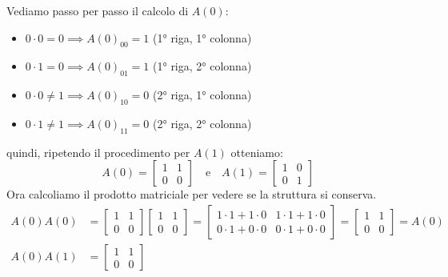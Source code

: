 \documentclass[../main.tex]{subfiles}
\begin{document}
\begin{example}
    Vediamo passo per passo il calcolo di $A(0)$:
    \begin{itemize}
        \item $0 \cdot 0 = 0 \implies A(0)_{00} = 1$ (1° riga, 1° colonna)
        \item $0 \cdot 1 = 0 \implies A(0)_{01} = 1$ (1° riga, 2° colonna)
        \item $0 \cdot 0 \neq 1 \implies A(0)_{10} = 0$ (2° riga, 1° colonna)
        \item $0 \cdot 1 \neq 1 \implies A(0)_{11} = 0$ (2° riga, 2° colonna)
    \end{itemize}
    quindi, ripetendo il procedimento per $A(1)$ otteniamo:
    \[
        A(0) = \begin{bmatrix}
            1 & 1 \\
            0 & 0
        \end{bmatrix}
        \quad \text{e} \quad
        A(1) = \begin{bmatrix}
            1 & 0 \\
            0 & 1
        \end{bmatrix}
    \]
    Ora calcoliamo il prodotto matriciale per vedere se la struttura si conserva.
    \begin{align*}
        A(0)A(0) & = \begin{bmatrix}
                         1 & 1 \\
                         0 & 0
                     \end{bmatrix}
        \begin{bmatrix}
            1 & 1 \\
            0 & 0
        \end{bmatrix}
        = \begin{bmatrix}
              1 \cdot 1 + 1 \cdot 0 & 1 \cdot 1 + 1 \cdot 0 \\
              0 \cdot 1 + 0 \cdot 0 & 0 \cdot 1 + 0 \cdot 0
          \end{bmatrix}
        = \begin{bmatrix}
              1 & 1 \\
              0 & 0
          \end{bmatrix}
        = A(0)                      \\
        A(0)A(1) & = \begin{bmatrix}
                         1 & 1 \\
                         0 & 0
                     \end{bmatrix}

\end{align*}
\end{example}
\end{document}
